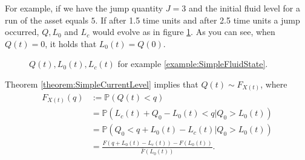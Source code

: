 \begin{example}\label{example:SimpleFluidState}
	For example, if we have the jump quantity $J=3$ and the initial fluid level for a run of the asset equals $5$.
	If after 1.5 time units and after 2.5 time units a jump occurred, $Q,L_0$ and $L_c$ would evolve as in figure \ref{figure:SimpleFluidExampleQuantities}.
	As you can see, when $Q(t)=0$, it holds that $L_0(t)=Q(0)$.
\end{example}
\begin{figure}[H]
\centering
\setlength{}

\caption{$Q(t),L_0(t),L_c(t)$ for example \ref{example:SimpleFluidState}.}
\label{figure:SimpleFluidExampleQuantities}
\end{figure}

\begin{corollary}\label{corollary:SimpleFluidDistribution}
	Theorem \ref{theorem:SimpleCurrentLevel} implies that $Q(t)\sim F_{X(t)}$, where
	\begin{equation}\label{eq:SimpleCurrentDistribution}
	\begin{split}
	F_{X(t)}(q)&:=\mathbb{P}(Q(t)<q)\\
	&=\mathbb{P}(L_c(t)+Q_0-L_0(t)<q|Q_0>L_0(t))\\
	&=\mathbb{P}(Q_0<q+L_0(t)-L_c(t)|Q_0>L_0(t))\\
	&=\frac{F(q+L_0(t)-L_c(t))-F(L_0(t))}{\bar{F}(L_0(t))}.\\
	\end{split}
	\end{equation}
\end{corollary}

